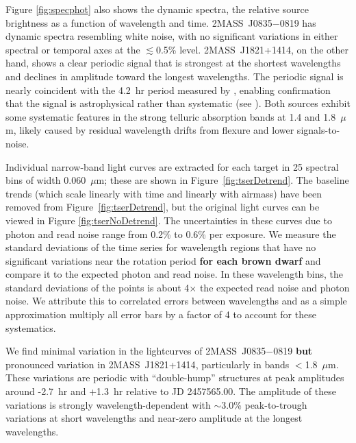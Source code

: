 \documentclass[twocolumn]{aastex6}
\newcommand{\sha}{2MASS~J0835$-$0819}
\newcommand{\shb}{2MASS~J1821+1414}
\begin{document}
Figure \ref{fig:specphot} also shows the dynamic spectra, the relative source brightness as a function of wavelength and time.
{\sha} has dynamic spectra resembling white noise, with no significant variations in either spectral or temporal axes at the $\lesssim$0.5\% level.
{\shb}, on the other hand, shows a clear periodic signal that is strongest at the shortest wavelengths and declines in amplitude toward the longest wavelengths. The periodic signal is nearly coincident with the 4.2~hr period measured by \citet{2015ApJ...799..154M}, enabling confirmation that the signal is astrophysical rather than systematic (see \citealt{2016ApJ...826..156S}).
Both sources exhibit some systematic features in the strong telluric absorption bands at 1.4 and 1.8~$\mu$m, likely caused by residual wavelength drifts from flexure and lower signals-to-noise.

Individual narrow-band light curves are extracted for each target in 25 spectral bins of width 0.060~$\mu$m; these are shown in Figure~\ref{fig:tserDetrend}.
The baseline trends (which scale linearly with time and linearly with airmass) have been removed from Figure~\ref{fig:tserDetrend}, but the original light curves can be viewed in Figure \ref{fig:tserNoDetrend}.
The uncertainties in these curves due to photon and read noise range from 0.2\% to 0.6\% per exposure.
We measure the standard deviations of the time series for wavelength regions that have no significant variations near the rotation period \textbf{for each brown dwarf} and compare it to the expected photon and read noise.
In these wavelength bins, the standard deviations of the points is about 4$\times$ the expected read noise and photon noise.
We attribute this to correlated errors between wavelengths and as a simple approximation multiply all error bars by a factor of 4 to account for these systematics.

We find minimal variation in the lightcurves of {\sha} \textbf{but} pronounced variation in {\shb}, particularly in bands $<$1.8~$\mu$m. 
These variations are periodic with ``double-hump'' structures at peak amplitudes around -2.7~hr and +1.3~hr relative to JD 2457565.00.
The amplitude of these variations is strongly wavelength-dependent with $\sim$3.0\% peak-to-trough variations at short 
wavelengths and near-zero amplitude at the longest wavelengths.
\end{document}
